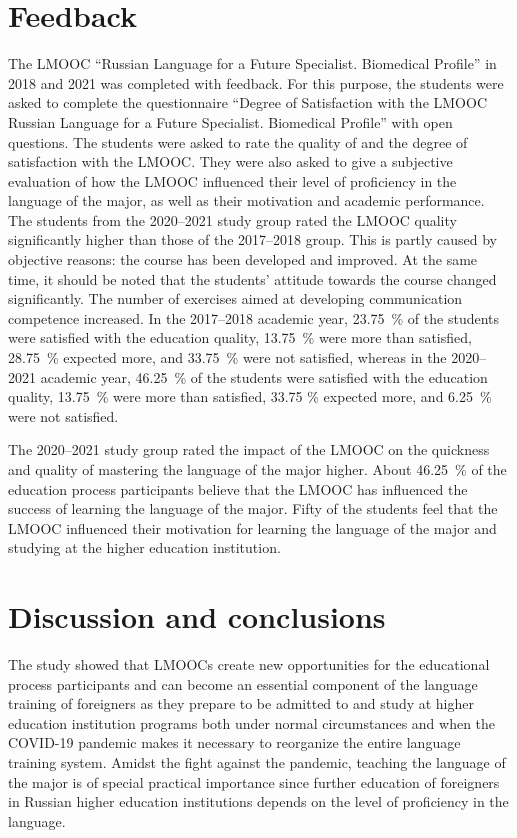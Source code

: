 \documentclass[english]{textolivre}
\begin{document}
\section{Feedback}\label{sec-resumo}
The LMOOC “Russian Language for a Future Specialist. Biomedical Profile” in 2018 and 2021 was completed with feedback. For this purpose, the students were asked to complete the questionnaire “Degree of Satisfaction with the LMOOC Russian Language for a Future Specialist. Biomedical Profile” with open questions. The students were asked to rate the quality of and the degree of satisfaction with the LMOOC. They were also asked to give a subjective evaluation of how the LMOOC influenced their level of proficiency in the language of the major, as well as their motivation and academic performance. The students from the 2020–2021 study group rated the LMOOC quality significantly higher than those of the 2017–2018 group. This is partly caused by objective reasons: the course has been developed and improved. At the same time, it should be noted that the students’ attitude towards the course changed significantly. The number of exercises aimed at developing communication competence increased. In the 2017–2018 academic year, 23.75 \% of the students were satisfied with the education quality, 13.75 \% were more than satisfied, 28.75 \% expected more, and 33.75 \% were not satisfied, whereas in the 2020–2021 academic year, 46.25 \% of the students were satisfied with the education quality, 13.75 \% were more than satisfied, 33.75 \% expected more, and 6.25 \% were not satisfied.

The 2020–2021 study group rated the impact of the LMOOC on the quickness and quality of mastering the language of the major higher. About 46.25 \% of the education process participants believe that the LMOOC has influenced the success of learning the language of the major. Fifty of the students feel that the LMOOC influenced their motivation for learning the language of the major and studying at the higher education institution.

\section{Discussion and conclusions}\label{sec-secoes}
The study showed that LMOOCs create new opportunities for the educational process participants and can become an essential component of the language training of foreigners as they prepare to be admitted to and study at higher education institution programs both under normal circumstances and when the COVID-19 pandemic makes it necessary to reorganize the entire language training system. Amidst the fight against the pandemic, teaching the language of the major is of special practical importance since further education of foreigners in Russian higher education institutions depends on the level of proficiency in the language.
\end{document}
